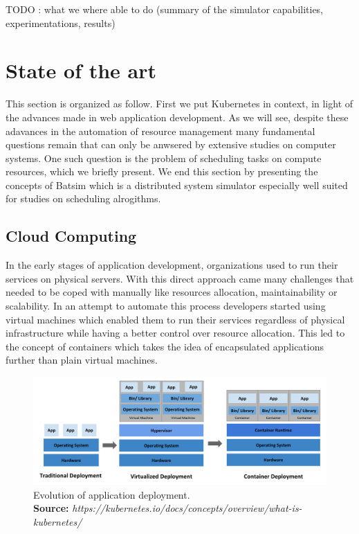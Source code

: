 \documentclass[12pt, a4paper]{memoir}
\newcommand*{\captionsource}[2]{%
    \caption[{#1}]{%
        #1%
        \\\hspace{\linewidth}%
	\textbf{Source:} \textit{#2}%
    }%
}
\begin{document}
TODO : what we where able to do (summary of the simulator capabilities,
experimentations, results)

\chapter{State of the art}

This section is organized as follow. First we put Kubernetes in context, in
light of the advances made in web application development. As we will see,
despite these adavances in the automation of resource management many
fundamental questions remain that can only be anwsered by extensive studies on
computer systems. One such question is the problem of scheduling tasks on
compute resources, which we briefly present. We end this section by presenting
the concepts of Batsim which is a distributed system simulator especially well
suited for studies on scheduling alrogithms.

\section{Cloud Computing}

In the early stages of application development, organizations used to run their
services on physical servers. With this direct approach came many challenges
that needed to be coped with manually like resources allocation,
maintainability or scalability. In an attempt to automate this process
developers started using virtual machines which enabled them to run their
services regardless of physical infrastructure while having a better control
over resource allocation.  This led to the concept of containers which takes
the idea of encapsulated applications further than plain virtual machines.

\begin{figure}[h]
	\centering
	\includegraphics[width=\textwidth]{./imgs/container_evolution.png}
	\captionsource{Evolution of application deployment.}{https://kubernetes.io/docs/concepts/overview/what-is-kubernetes/}
	\label{fig:container-evolution}
\end{figure}
\end{document}
